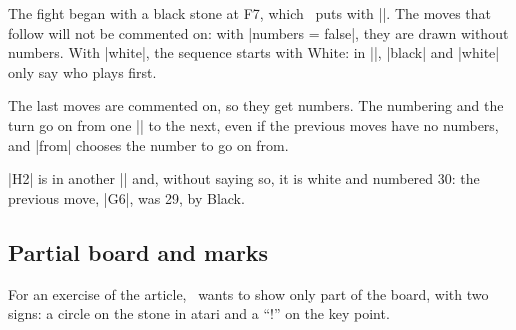 \begin{goban}
\begin{codeexample}[width=5cm]
\begin{goban}[label = {at = all}]
\end{goban}
\end{codeexample}

The fight began with a black stone at F7, which \karu\ puts with |\stone|. The moves that follow will not be commented on: with |numbers = false|, they are drawn without numbers. With |white|, the sequence starts with White: in |\moves|, |black| and |white| only say who plays first.

\begin{codeexample}[width=5cm]
\begin{goban}[label = {at = all}]
\end{goban}
\end{codeexample}

The last moves are commented on, so they get numbers. The numbering and the turn go on from one |\moves| to the next, even if the previous moves have no numbers, and |from| chooses the number to go on from.

\begin{codeexample}[width=5cm]
\begin{goban}[label = {at = all}]

\end{goban}
\end{codeexample}

|H2| is in another |\moves| and, without saying so, it is white and numbered 30: the previous move, |G6|, was 29, by Black.

\subsection{Partial board and marks}
\label{tut:parcial}

For an exercise of the article, \karu\ wants to show only part of the board, with two signs: a circle on the stone in atari and a ``!'' on the key point.

\begin{figure}[H]
	\centering
	\begin{goban}[partial = B2:E4, background = {line = false}]
	\end{goban}
\end{figure}


\end{goban}

